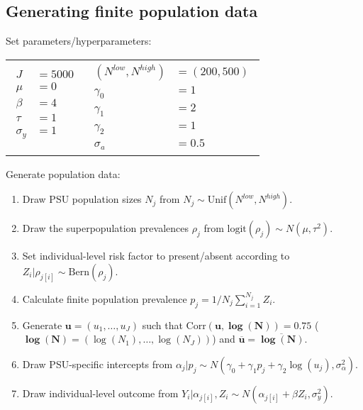\documentclass[10pt,a4paper]{article}
\begin{document}
\subsection*{Generating finite population data}\label{popdata}
Set parameters/hyperparameters:
\begin{center}
	\begin{tabular}{cc} 
		{$\!\begin{aligned}
			J &= 5000 \\
			\mu &= 0 \\
			\beta &= 4 \\
			\tau &= 1 \\
			\sigma_y &= 1 \\ \end{aligned}$} & {$\!\begin{aligned}
			(N^{low}, N^{high}) &= (200, 500) \\
			\gamma_0 &= 1 \\
			\gamma_1 &= 2 \\
			\gamma_2 &= 1 \\
			\sigma_a &= 0.5 \end{aligned}$}
	\end{tabular}
\end{center}
Generate population data:
\begin{enumerate}
	\item Draw PSU population sizes $N_j$ from $N_j \sim \mathrm{Unif}(N^{low}, N^{high})$.
	\item Draw the superpopulation prevalences $\rho_j$ from $\mathrm{logit}(\rho_j) \sim N(\mu, \tau^2)$.
	\item Set individual-level risk factor to present/absent according to $Z_i | \rho_{j[i]} \sim \mathrm{Bern}(\rho_j)$.
	\item Calculate finite population prevalence $p_j = 1/N_j \sum_{i=1}^{N_j} Z_i$.
	\item Generate $\mathbf{u} = (u_1, \ldots, u_J)$ such that $\mathrm{Corr}(\mathbf{u}, \mathbf{\log(N)}) = 0.75$ ($\mathbf{\log(N)} = (\log(N_1), \ldots, \log(N_J))$) and $\overline{\mathbf{u}} = \overline{\mathbf{\log(N)}}$.
	\item Draw PSU-specific intercepts from $\alpha_j | p_j \sim N(\gamma_0 + \gamma_1 p_j + \gamma_2 \log(u_j), \sigma_{\alpha}^2)$.
	\item Draw individual-level outcome from $Y_i | \alpha_{j[i]}, Z_i \sim N(\alpha_{j[i]} + \beta Z_i, \sigma_y^2)$.
\end{enumerate}
\end{document}
